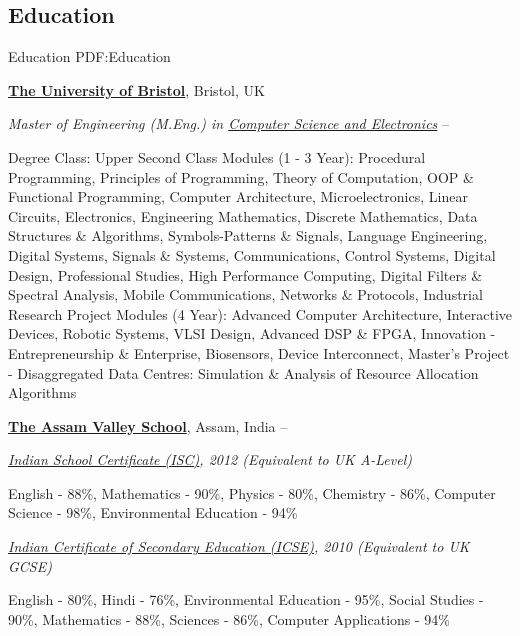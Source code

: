 \documentclass[a4paper,10pt,oneside]{article}
\begin{document}
\begin{body}


\section
{Education}
{Education}
{PDF:Education}

\href{http://www.bristol.ac.uk/}
{\textbf{The University of Bristol}},
Bristol, UK

\EntryGapNoBreak
\textit{Master of Engineering (M.Eng.) in
\href{http://www.bristol.ac.uk/engineering/departments/eeng/}
{Computer Science and Electronics}}
\hfill
{} --
\begin{detail}
\BulletItem
Degree Class: Upper Second Class
\BulletItem
Modules (1 - 3 Year): Procedural Programming, Principles of Programming, Theory of Computation, OOP \& Functional Programming, Computer Architecture, Microelectronics, Linear Circuits, Electronics, Engineering Mathematics, Discrete Mathematics, Data Structures \& Algorithms, Symbols-Patterns \& Signals, Language Engineering, Digital Systems, Signals \& Systems, Communications, Control Systems, Digital Design, Professional Studies, High Performance Computing, Digital Filters \& Spectral Analysis, Mobile Communications, Networks \& Protocols, Industrial Research Project
\BulletItem
Modules (4 Year): Advanced Computer Architecture, Interactive Devices, Robotic Systems, VLSI Design, Advanced DSP \& FPGA, Innovation - Entrepreneurship \& Enterprise, Biosensors, Device Interconnect, Master's Project - Disaggregated Data Centres: Simulation \& Analysis of Resource Allocation Algorithms
\end{detail}

\BigEntryGapNoBreak
\href{http://www.assamvalleyschool.com}
{\textbf{The Assam Valley School}},
Assam, India
\hfill
{} --

\EntryGapNoBreak
\textit{\href{http://www.cisce.org/}
{Indian School Certificate (ISC)},
2012
(Equivalent to UK A-Level)}
\begin{detail}
\BulletItem
English - 88\%, Mathematics - 90\%, Physics - 80\%, Chemistry - 86\%, Computer Science - 98\%, Environmental Education - 94\%
\end{detail}

\EntryGapNoBreak
\textit{\href{http://www.cisce.org/}
{Indian Certificate of Secondary Education (ICSE)},
2010
(Equivalent to UK GCSE)}
\begin{detail}
\BulletItem
English - 80\%, Hindi - 76\%, Environmental Education - 95\%, Social Studies - 90\%, Mathematics - 88\%, Sciences - 86\%, Computer Applications - 94\%
\end{detail}
\vspace{-5pt}
\hline


\end{body}
\end{document}
